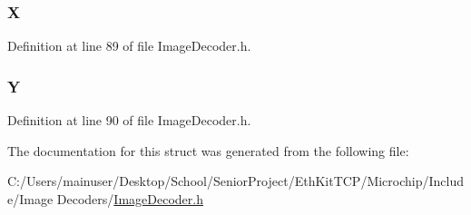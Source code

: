 \subsubsection[{X}]{ X}\label{struct___i_m_g___p_i_x_e_l___x_y___r_g_b__888_a7b0996e32ac615aee22f3b895d45f5c8}


Definition at line 89 of file Image\+Decoder.\+h.

\hypertarget{struct___i_m_g___p_i_x_e_l___x_y___r_g_b__888_ad83f3cd64de290d13d00032f988ac2c4}{}
\subsubsection[{Y}]{ Y}\label{struct___i_m_g___p_i_x_e_l___x_y___r_g_b__888_ad83f3cd64de290d13d00032f988ac2c4}


Definition at line 90 of file Image\+Decoder.\+h.



The documentation for this struct was generated from the following file\+:\begin{DoxyCompactItemize}
\item 
C\+:/\+Users/mainuser/\+Desktop/\+School/\+Senior\+Project/\+Eth\+Kit\+T\+C\+P/\+Microchip/\+Include/\+Image Decoders/\hyperlink{_image_decoder_8h}{Image\+Decoder.\+h}\end{DoxyCompactItemize}
